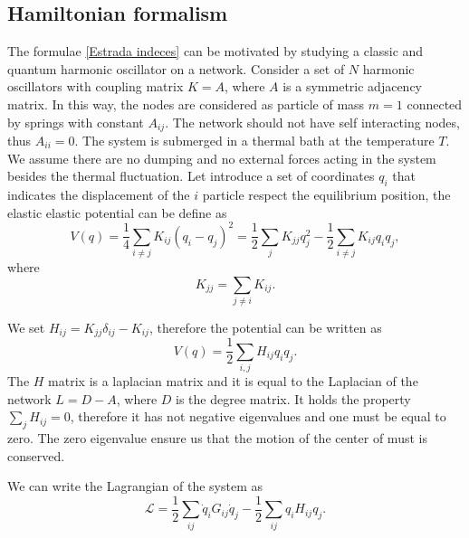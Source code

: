 
\subsection{Hamiltonian formalism}
The formulae \eqref{Estrada indeces} can be motivated by studying a classic and quantum harmonic oscillator on a network.
Consider a set of $N$ harmonic oscillators with coupling matrix $K = A$, where $A$ is a symmetric adjacency matrix. In this way, the nodes are considered as particle of mass $m = 1$ connected by springs with constant $A_{ij}$. The network should not have self interacting nodes, thus $A_{ii} = 0$. The system is submerged in a thermal bath at the temperature $T$. We assume there are no dumping and no external forces acting in the system besides the thermal fluctuation. 
Let introduce a set of coordinates $q_i$ that indicates the displacement of the $i$ particle respect the equilibrium position, the elastic elastic potential can be define as
\begin{equation}
    V(q) = \frac{1}{4}\sum_{i\neq j} K_{ij}(q_i-q_j)^2 = \frac{1}{2}\sum_{j}K_{jj}q_j^2 - \frac{1}{2} \sum_{i\neq j}K_{ij}q_iq_j,
\end{equation}
where 
\begin{equation}
    K_{jj} = \sum_{j \neq i} K_{ij}.
\end{equation}

We set $H_{ij}= K_{jj}\delta_{ij} - K_{ij}$, therefore the potential can be written as
\begin{equation}
    V(q) = \frac{1}{2}\sum_{i,j} H_{ij} q_i q_j.
\end{equation}
The $H$ matrix is a laplacian matrix and it is equal to the Laplacian of the network $L = D - A$, where $D$ is the degree matrix. It holds the property $\sum_j H_{ij} = 0$, therefore it has not negative eigenvalues and one must be equal to zero.
The zero eigenvalue ensure us that the motion of the center of must is conserved. %

We can write the Lagrangian of the system as
\begin{equation}
    \mathcal{L} = \frac{1}{2}\sum_{ij} \dot q_i G_{ij} \dot q_j - \frac{1}{2} \sum_{ij} q_iH_{ij}q_j.
\end{equation}

